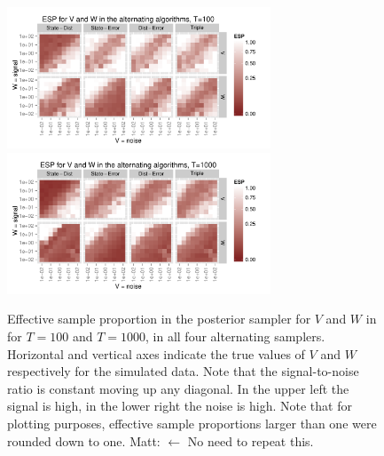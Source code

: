 \documentclass{article}
\newcommand{\matt}[1]{{\color{red} Matt: #1}}
\begin{document}
\begin{figure}[!ht]
\centering
\includegraphics[width=0.7\textwidth]{altESplot1}
\includegraphics[width=0.7\textwidth]{altESplot2}
\caption{Effective sample proportion in the posterior sampler for $V$ and $W$ in for $T=100$ and $T=1000$, in all four alternating samplers. Horizontal and vertical axes indicate the true values of $V$ and $W$ respectively for the simulated data. Note that the signal-to-noise ratio is constant moving up any diagonal. In the upper left the signal is high, in the lower right the noise is high. Note that for plotting purposes, effective sample proportions larger than one were rounded down to one. \matt{$\leftarrow$ No need to repeat this.}}
\label{altESplot}
\end{figure}
\end{document}

